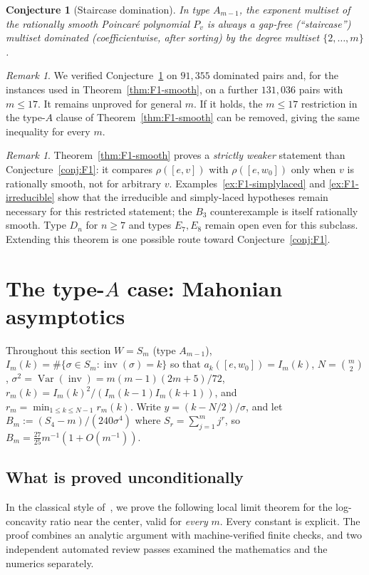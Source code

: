 \documentclass[11pt]{amsart}
\theoremstyle{plain}
\newtheorem{conjecture}[theorem]{Conjecture}
\theoremstyle{definition}
\theoremstyle{remark}
\newtheorem{remark}[theorem]{Remark}
\newcommand{\W}{W}
\DeclareMathOperator{\inv}{inv}
\DeclareMathOperator{\Var}{Var}
\begin{document}
\begin{conjecture}[Staircase domination]
\label{conj:staircase}
In type $A_{m-1}$, the exponent multiset of the rationally smooth Poincar\'e polynomial $P_v$ is always a gap-free (``staircase'') multiset
dominated (coefficientwise, after sorting) by the degree multiset
$\{2,\dots,m\}$.
\end{conjecture}

\begin{remark}
We verified Conjecture~\ref{conj:staircase} on $91{,}355$ dominated pairs
and, for the instances used in Theorem~\ref{thm:F1-smooth}, on a further
$131{,}036$ pairs with $m\le17$. It remains unproved for general $m$. If
it holds, the $m\le17$ restriction in the type-$A$ clause of
Theorem~\ref{thm:F1-smooth} can be removed, giving the same inequality for
every $m$.
\end{remark}

\begin{remark}
Theorem~\ref{thm:F1-smooth} proves a \emph{strictly weaker} statement than
Conjecture~\ref{conj:F1}: it compares $\rho([e,v])$ with
$\rho([e,w_0])$ only when $v$ is rationally smooth, not for arbitrary
$v$. Examples~\ref{ex:F1-simplylaced} and
\ref{ex:F1-irreducible} show that the irreducible and simply-laced
hypotheses remain necessary for this restricted statement; the $B_3$
counterexample is itself rationally smooth. Type $D_n$ for $n\ge7$ and
types $E_7,E_8$ remain open even for this subclass. Extending this theorem
is one possible route toward Conjecture~\ref{conj:F1}.
\end{remark}

\section{The type-\texorpdfstring{$A$}{A} case: Mahonian asymptotics}
\label{sec:F2}

Throughout this section $\W=S_m$ (type $A_{m-1}$), $I_m(k)=\#\{\sigma\in
S_m:\inv(\sigma)=k\}$ so that $a_k([e,w_0])=I_m(k)$, $N=\binom m2$,
$\sigma^2=\Var(\inv)=m(m-1)(2m+5)/72$, $r_m(k)=I_m(k)^2/(I_m(k-1)I_m(k+1))$,
and $r_m=\min_{1\le k\le N-1}r_m(k)$. Write $y=(k-N/2)/\sigma$, and let
$B_m:=(S_4-m)/(240\sigma^4)$ where $S_r=\sum_{j=1}^m j^r$, so $B_m=\tfrac{27}{25}m^{-1}(1+O(m^{-1}))$.

\subsection*{What is proved unconditionally}
In the classical style of~\cite{petrov1975}, we prove the following local limit theorem for the log-concavity ratio near the center, valid for \emph{every} $m$. Every constant is explicit. The proof combines an analytic argument
with machine-verified finite checks, and two independent automated review passes examined the mathematics and the numerics separately.
\end{document}
